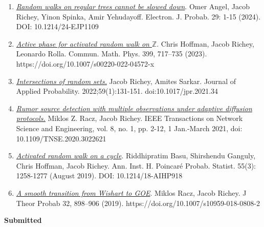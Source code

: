 \documentclass[letterpaper]{article}
\begin{document}
\begin{enumerate}
	\item \href{https://projecteuclid.org/journals/electronic-journal-of-probability/volume-29/issue-none/Random-walks-on-regular-trees-can-not-be-slowed-down/10.1214/24-EJP1109.full}{\textit{Random walks on regular trees cannot be slowed down}}. Omer Angel, Jacob Richey, Yinon Spinka, Amir Yehudayoff. Electron. J. Probab. 29: 1-15 (2024). DOI: 10.1214/24-EJP1109 
	 

	  
	\item \href{https://link.springer.com/article/10.1007/s00220-022-04572-x}{\textit{Active phase for activated random walk on $\mathbb{Z}$}}. Chris Hoffman, Jacob Richey, Leonardo Rolla. Commun. Math. Phys. 399, 717–735 (2023). https://doi.org/10.1007/s00220-022-04572-x
	
		\item \href{https://www.cambridge.org/core/journals/journal-of-applied-probability/article/abs/intersections-of-random-sets/F94BF856EBE488909E2132C3BEBD0DDC}{\textit{Intersections of random sets.}} Jacob Richey, Amites Sarkar. Journal of Applied Probability. 2022;59(1):131-151. doi:10.1017/jpr.2021.34 
	   
	\item \href{https://ieeexplore.ieee.org/document/9187692}{\textit{Rumor source detection with multiple observations under adaptive diffusion protocols.}} Miklos Z. Racz, Jacob Richey. IEEE Transactions on Network Science and Engineering, vol. 8, no. 1, pp. 2-12, 1 Jan.-March 2021, doi: 10.1109/TNSE.2020.3022621
	    
 	\item \href{https://projecteuclid.org/journals/annales-de-linstitut-henri-poincare-probabilites-et-statistiques/volume-55/issue-3/Activated-random-walk-on-a-cycle/10.1214/18-AIHP918.full}{\textit{Activated random walk on a cycle}}. Riddhipratim Basu, Shirshendu Ganguly, Chris Hoffman, Jacob Richey. Ann. Inst. H. Poincaré Probab. Statist. 55(3): 1258-1277 (August 2019). DOI: 10.1214/18-AIHP918 
 
	\item \href{https://link.springer.com/article/10.1007/s10959-018-0808-2}{\textit{A smooth transition from Wishart to GOE}}. Miklos Racz, Jacob Richey. J Theor Probab 32, 898–906 (2019). https://doi.org/10.1007/s10959-018-0808-2
 \end{enumerate}
 
 \newpage
 
 \begin{center} {\textbf{Submitted}} \end{center}
 
\end{document}
